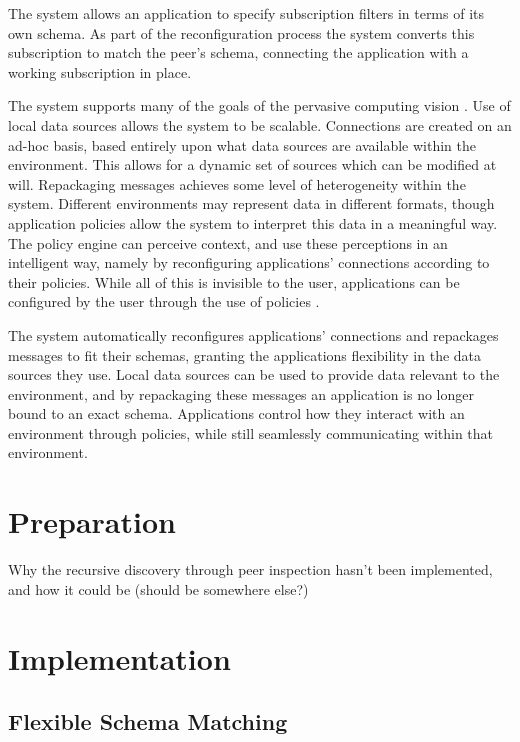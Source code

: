\documentclass[12pt,twoside,notitlepage]{report}
\begin{document}
The system allows an application to specify subscription filters in terms of its own schema. 
As part of the reconfiguration process the system converts this subscription to match the peer's schema, connecting the application with a working subscription in place.

The system supports many of the goals of the pervasive computing vision \cite{weiser1991computer}.
Use of local data sources allows the system to be scalable. 
Connections are created on an ad-hoc basis, based entirely upon what data sources are available within the environment. 
This allows for a dynamic set of sources which can be modified at will. 
Repackaging messages achieves some level of heterogeneity within the system. 
Different environments may represent data in different formats, though application policies allow the system to interpret this data in a meaningful way. 
The policy engine can perceive context, and use these perceptions in an intelligent way, namely by reconfiguring applications' connections according to their policies. 
While all of this is invisible to the user, applications can be configured by the user through the use of policies \cite{saha2003pervasive}.

The system automatically reconfigures applications' connections and repackages messages to fit their schemas, granting the applications flexibility in the data sources they use.
Local data sources can be used to provide data relevant to the environment, and by repackaging these messages an application is no longer bound to an exact schema. 
Applications control how they interact with an environment through policies, while still seamlessly communicating within that environment.

\cleardoublepage

 
\chapter{Preparation}

Why the recursive discovery through peer inspection hasn't been implemented, and how it could be (should be somewhere else?)

\cleardoublepage


\chapter{Implementation}

\section{Flexible Schema Matching}
\end{document}
